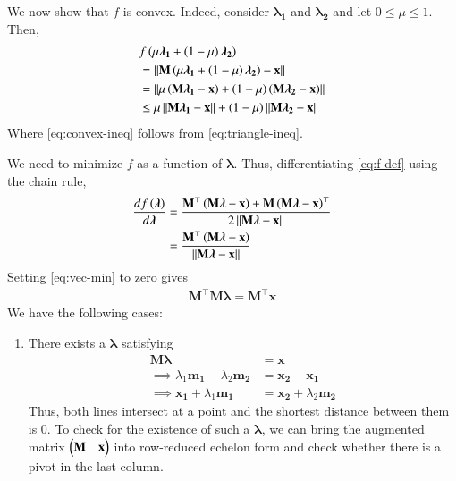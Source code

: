 \documentclass[journal,12pt,twocolumn]{IEEEtran}
\renewcommand{\vec}[1]{\boldsymbol{\mathbf{#1}}}
\begin{document}
\begin{enumerate}
    We now show that $f$ is convex. Indeed, consider $\vec{\lambda_1}$ and 
    $\vec{\lambda_2}$ and let $0 \le \mu \le 1$. Then,
    \begin{align}
        &f\brak{\mu\vec{\lambda_1}+\brak{1-\mu}\vec{\lambda_2}} \\
        &= \norm{\vec{M}\brak{\mu\vec{\lambda_1}+\brak{1-\mu}\vec{\lambda_2}}-\vec{x}} \\
        &= \norm{\mu\brak{\vec{M}\vec{\lambda_1}-\vec{x}}+\brak{1-\mu}\brak{\vec{M}\vec{\lambda_2}-\vec{x}}} \\
        &\le \mu\norm{\vec{M\lambda_1}-\vec{x}} + \brak{1-\mu}\norm{\vec{M\lambda_2}-\vec{x}}
        \label{eq:convex-ineq}
    \end{align}
    Where \eqref{eq:convex-ineq} follows from \eqref{eq:triangle-ineq}.

    We need to minimize $f$ as a function of $\vec{\lambda}$. Thus, 
    differentiating \eqref{eq:f-def} using the chain rule,
    \begin{align}
        \frac{df\brak{\vec{\lambda}}}{d\vec{\lambda}} &= \frac{\vec{M}^\top\brak{\vec{M\lambda}-\vec{x}}+\vec{M}\brak{\vec{M\lambda}-\vec{x}}^\top}{2\norm{\vec{M\lambda}-\vec{x}}} \\
                                                      &= \frac{\vec{M}^\top\brak{\vec{M\lambda}-\vec{x}}}{\norm{\vec{M\lambda}-\vec{x}}}
        \label{eq:vec-min}
    \end{align}
    Setting \eqref{eq:vec-min} to zero gives
    \begin{align}
        \vec{M}^\top\vec{M\lambda} = \vec{M}^\top\vec{x}
        \label{eq:vec-eqn}
    \end{align}
    We have the following cases:
    \begin{enumerate}
        \item There exists a $\vec{\lambda}$ satisfying
        \begin{align}
            \vec{M}\vec{\lambda} &= \vec{x} \\
            \implies \lambda_1\vec{m_1} - \lambda_2\vec{m_2} &= \vec{x_2}-\vec{x_1} \\
            \implies \vec{x_1} + \lambda_1\vec{m_1} &= \vec{x_2} + \lambda_2\vec{m_2}
            \label{eq:intersect}
        \end{align}
        Thus, both lines intersect at a point and the shortest
        distance between them is 0. To check for the existence of such a 
        $\vec{\lambda}$, we can bring the augmented matrix 
        $\myvec{\vec{M}&\vec{x}}$ into row-reduced echelon form and check 
        whether there is a pivot in the last column.


\end{enumerate}
\end{enumerate}
\end{document}

